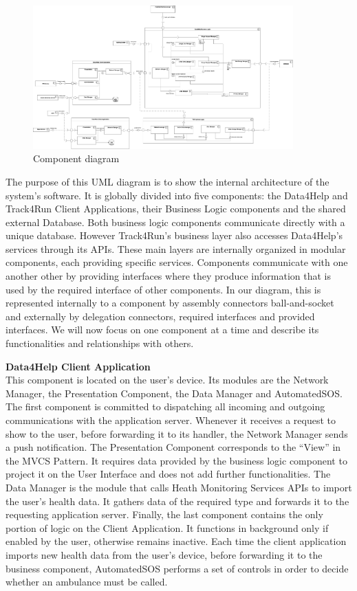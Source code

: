 \documentclass[titlepage]{article}
\begin{document}
\begin{figure}[H]
	\center
  	\includegraphics[width=10cm]{ComponentDiagram.png}
  	\caption{Component diagram}
 	\label{fig:COMPDIA}
\end{figure}

The purpose of this UML diagram is to show the internal architecture of the system’s software. It is globally divided into five components: the Data4Help and Track4Run Client Applications, their Business Logic components and the shared external Database. Both business logic components communicate directly with a unique database. However Track4Run’s business layer also accesses Data4Help’s services through its APIs. These main layers are internally organized in modular components, each providing specific services. 
Components communicate with one another other by providing interfaces where they produce information that is used by the required interface of other components. In our diagram, this is represented internally to a component by assembly connectors ball-and-socket and externally by delegation connectors, required interfaces and provided interfaces.
We will now focus on one component at a time and describe its functionalities and relationships with others. 

{\bf Data4Help Client Application }\\ 
This component is located on the user’s device. Its modules are the Network Manager, the Presentation Component, the Data Manager and AutomatedSOS. 
The first component is committed to dispatching all incoming and outgoing communications with the application server. Whenever it receives a request to show to the user, before forwarding it to its handler, the Network Manager sends a push notification.
The Presentation Component corresponds to the “View” in the MVCS Pattern. It requires data provided by the business logic component to project it on the User Interface and does not add further functionalities. 
The Data Manager is the module that calls Heath Monitoring Services APIs to import the user’s health data. It gathers data of the required type and forwards it to the requesting application server.
Finally, the last component contains the only portion of logic on the Client Application. It functions in background only if enabled by the user, otherwise remains inactive. Each time the client application imports new health data from the user’s device, before forwarding it to the business component, AutomatedSOS performs a set of controls in order to decide whether an ambulance must be called. 
\end{document}
